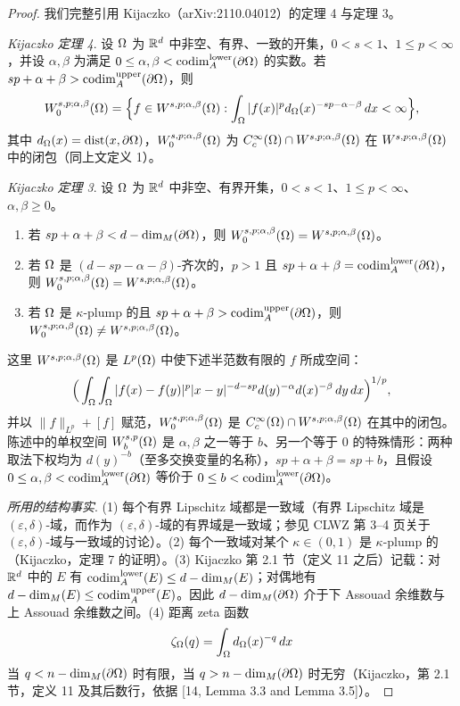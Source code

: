 \begin{proof}
我们完整引用 Kijaczko（arXiv:2110.04012）的定理 4 与定理 3。

\emph{Kijaczko 定理 4}. 设 $\Omega$ 为 $\mathbb{R}^d$ 中非空、有界、一致的开集，$0<s<1$、$1\le p<\infty$，并设 $\alpha,\beta$ 为满足 $0\le\alpha,\beta<\operatorname{codim}_{A}^{\mathrm{lower}}(\partial\Omega)$ 的实数。若 $sp+\alpha+\beta>\operatorname{codim}_{A}^{\mathrm{upper}}(\partial\Omega)$，则
\[
  W_0^{s,p;\alpha,\beta}(\Omega)=\Big\{f\in W^{s,p;\alpha,\beta}(\Omega):\int_\Omega|f(x)|^p d_\Omega(x)^{-sp-\alpha-\beta}\,dx<\infty\Big\},
\]
其中 $d_\Omega(x)=\operatorname{dist}(x,\partial\Omega)$，$W_0^{s,p;\alpha,\beta}(\Omega)$ 为 $C_c^\infty(\Omega)\cap W^{s,p;\alpha,\beta}(\Omega)$ 在 $W^{s,p;\alpha,\beta}(\Omega)$ 中的闭包（同上文定义 1）。

\emph{Kijaczko 定理 3}. 设 $\Omega$ 为 $\mathbb{R}^d$ 中非空、有界开集，$0<s<1$、$1\le p<\infty$、$\alpha,\beta\ge0$。
\begin{enumerate}[label=(\Roman*)]
  \item 若 $sp+\alpha+\beta<d-\dim_{M}(\partial\Omega)$，则 $W_0^{s,p;\alpha,\beta}(\Omega)=W^{s,p;\alpha,\beta}(\Omega)$。
  \item 若 $\Omega$ 是 $(d-sp-\alpha-\beta)$-齐次的，$p>1$ 且 $sp+\alpha+\beta=\operatorname{codim}_{A}^{\mathrm{lower}}(\partial\Omega)$，则 $W_0^{s,p;\alpha,\beta}(\Omega)=W^{s,p;\alpha,\beta}(\Omega)$。
  \item 若 $\Omega$ 是 $\kappa$-plump 的且 $sp+\alpha+\beta>\operatorname{codim}_{A}^{\mathrm{upper}}(\partial\Omega)$，则 $W_0^{s,p;\alpha,\beta}(\Omega)\neq W^{s,p;\alpha,\beta}(\Omega)$。
\end{enumerate}

这里 $W^{s,p;\alpha,\beta}(\Omega)$ 是 $L^p(\Omega)$ 中使下述半范数有限的 $f$ 所成空间：
\[
  \Big(\int_\Omega\int_\Omega|f(x)-f(y)|^p|x-y|^{-d-sp}d(y)^{-\alpha}d(x)^{-\beta}\,dy\,dx\Big)^{1/p},
\]
并以 $\|f\|_{L^p}+[f]$ 赋范，$W_0^{s,p;\alpha,\beta}(\Omega)$ 是 $C_c^\infty(\Omega)\cap W^{s,p;\alpha,\beta}(\Omega)$ 在其中的闭包。陈述中的单权空间 $W_b^{s,p}(\Omega)$ 是 $\alpha,\beta$ 之一等于 $b$、另一个等于 $0$ 的特殊情形：两种取法下权均为 $d(y)^{-b}$（至多交换变量的名称），$sp+\alpha+\beta=sp+b$，且假设 $0\le\alpha,\beta<\operatorname{codim}_{A}^{\mathrm{lower}}(\partial\Omega)$ 等价于 $0\le b<\operatorname{codim}_{A}^{\mathrm{lower}}(\partial\Omega)$。

\emph{所用的结构事实}. (1) 每个有界 Lipschitz 域都是一致域（有界 Lipschitz 域是 $(\varepsilon,\delta)$-域，而作为 $(\varepsilon,\delta)$-域的有界域是一致域；参见 CLWZ 第 3--4 页关于 $(\varepsilon,\delta)$-域与一致域的讨论）。(2) 每个一致域对某个 $\kappa\in(0,1)$ 是 $\kappa$-plump 的（Kijaczko，定理 7 的证明）。(3) Kijaczko 第 2.1 节（定义 11 之后）记载：对 $\mathbb{R}^d$ 中的 $E$ 有 $\operatorname{codim}_{A}^{\mathrm{lower}}(E)\le d-\dim_{M}(E)$；对偶地有 $d-\dim_{M}(E)\le\operatorname{codim}_{A}^{\mathrm{upper}}(E)$。因此 $d-\dim_{M}(\partial\Omega)$ 介于下 Assouad 余维数与上 Assouad 余维数之间。(4) 距离 zeta 函数
\[
  \zeta_\Omega(q)=\int_\Omega d_\Omega(x)^{-q}\,dx
\]
当 $q<n-\dim_{M}(\partial\Omega)$ 时有限，当 $q>n-\dim_{M}(\partial\Omega)$ 时无穷（Kijaczko，第 2.1 节，定义 11 及其后数行，依据 [14, Lemma 3.3 and Lemma 3.5]）。


\end{proof}
